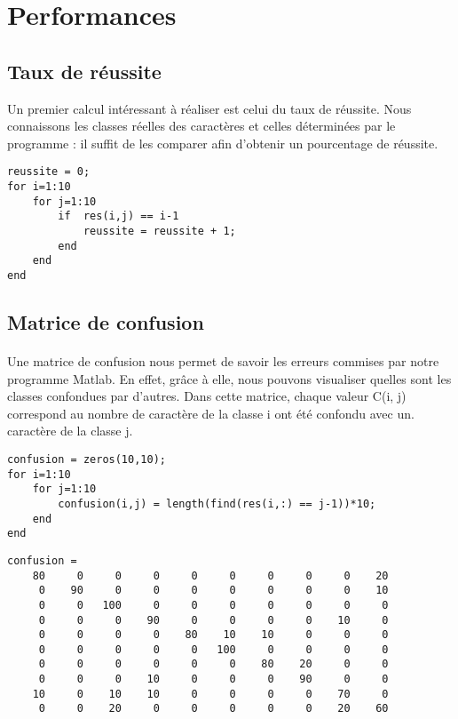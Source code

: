 \section{Performances}

\subsection{Taux de réussite}
Un premier calcul intéressant à réaliser est celui du taux de réussite. Nous connaissons les classes réelles des caractères et celles déterminées par le 
programme : il suffit de les comparer afin d'obtenir un pourcentage de réussite.
\\
\begin{lstlisting}
reussite = 0;
for i=1:10
	for j=1:10
		if  res(i,j) == i-1
			reussite = reussite + 1;
		end
	end
end
\end{lstlisting}

\subsection{Matrice de confusion}

\paragraph{}
Une matrice de confusion nous permet de savoir les erreurs commises par notre programme Matlab. En effet, grâce à elle, nous pouvons visualiser quelles sont 
les classes confondues par d'autres. Dans cette matrice, chaque valeur C(i, j) correspond au nombre de caractère de la classe i ont été confondu avec un. 
caractère de la classe j.
\\
\begin{lstlisting}
confusion = zeros(10,10);
for i=1:10
    for j=1:10
        confusion(i,j) = length(find(res(i,:) == j-1))*10;
    end
end
\end{lstlisting}

\begin{lstlisting}
confusion = 
	80     0     0     0     0     0     0     0     0    20
	 0    90     0     0     0     0     0     0     0    10
	 0     0   100     0     0     0     0     0     0     0
	 0     0     0    90     0     0     0     0    10     0
	 0     0     0     0    80    10    10     0     0     0
	 0     0     0     0     0   100     0     0     0     0
	 0     0     0     0     0     0    80    20     0     0
	 0     0     0    10     0     0     0    90     0     0
	10     0    10    10     0     0     0     0    70     0
	 0     0    20     0     0     0     0     0    20    60
\end{lstlisting}
